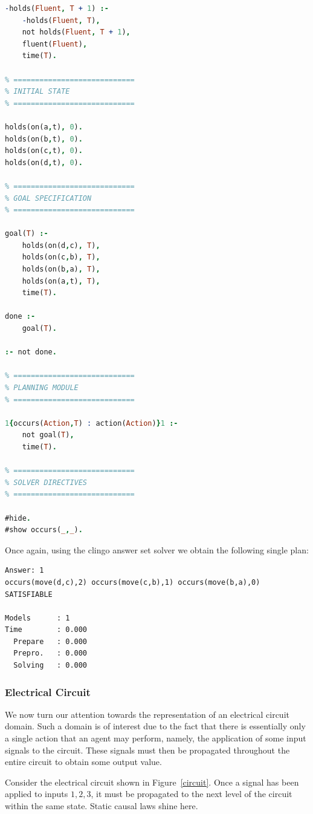 \documentclass{article}
\begin{document}
\begin{lstlisting}[language=Prolog, caption=Blocks World Domain Representation in A-Prolog, label=lst:bworld-asp]
-holds(Fluent, T + 1) :-
    -holds(Fluent, T),
    not holds(Fluent, T + 1),
    fluent(Fluent),
    time(T).

% ============================
% INITIAL STATE
% ============================

holds(on(a,t), 0).
holds(on(b,t), 0).
holds(on(c,t), 0).
holds(on(d,t), 0).

% ============================
% GOAL SPECIFICATION
% ============================

goal(T) :-
	holds(on(d,c), T),
	holds(on(c,b), T),
	holds(on(b,a), T),
	holds(on(a,t), T),
	time(T).

done :-
	goal(T).

:- not done.

% ============================
% PLANNING MODULE
% ============================

1{occurs(Action,T) : action(Action)}1 :-
    not goal(T),
    time(T).

% ============================
% SOLVER DIRECTIVES
% ============================

#hide.
#show occurs(_,_).
\end{lstlisting}

\noindent Once again, using the clingo answer set solver we obtain the following single plan:
\begin{verbatim}
Answer: 1
occurs(move(d,c),2) occurs(move(c,b),1) occurs(move(b,a),0) 
SATISFIABLE

Models      : 1     
Time        : 0.000
  Prepare   : 0.000
  Prepro.   : 0.000
  Solving   : 0.000
\end{verbatim}

\subsubsection{Electrical Circuit}

We now turn our attention towards the representation of an electrical circuit domain. Such a domain is of interest due to the fact that there is essentially only a single action that an agent may perform, namely, the application of some input signals to the circuit. These signals must then be propagated throughout the entire circuit to obtain some output value.

Consider the electrical circuit shown in Figure~\ref{circuit}. Once a signal has been applied to inputs $1,2,3$, it must be propagated to the next level of the circuit within the same state. Static causal laws shine here.
\end{document}
